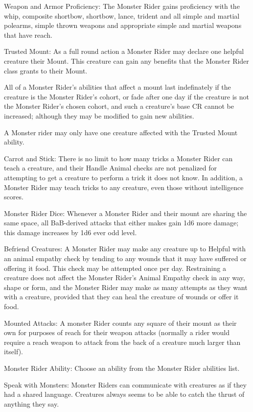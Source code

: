 Weapon and Armor Proficiency: The Monster Rider gains proficiency with the whip, composite shortbow, shortbow, lance, trident and all simple and martial polearms, simple thrown weapons and appropriate simple and martial weapons that have reach.

Trusted Mount: As a full round action a Monster Rider may declare one helpful creature their Mount. This creature can gain any benefits that the Monster Rider class grants to their Mount.

All of a Monster Rider's abilities that affect a mount last indefinately if the creature is the Monster Rider's cohort, or fade after one day if the creature is not the Monster Rider's chosen cohort, and such a creature's base CR cannot be increased; although they may be modified to gain new abilities.

A Monster rider may only have one creature affected with the Trusted Mount ability.

Carrot and Stick: There is no limit to how many tricks a Monster Rider can teach a creature, and their Handle Animal checks are not penalized for attempting to get a creature to perform a trick it does not know. In addition, a Monster Rider may teach tricks to any creature, even those without intelligence scores.

Monster Rider Dice: Whenever a Monster Rider and their mount are sharing the same space, all BaB-derived attacks that either makes gain 1d6 more damage; this damage increases by 1d6 ever odd level.

Befriend Creatures: A Monster Rider may make any creature up to Helpful with an animal empathy check by tending to any wounds that it may have suffered or offering it food. This check may be attempted once per day. Restraining a creature does not affect the Monster Rider's Animal Empathy check in any way, shape or form, and the Monster Rider may make as many attempts as they want with a creature, provided that they can heal the creature of wounds or offer it food.

Mounted Attacks: A monster Rider counts any square of their mount as their own for purposes of reach for their weapon attacks (normally a rider would require a reach weapon to attack from the back of a creature much larger than itself).

Monster Rider Ability: Choose an ability from the Monster Rider abilities list.

Speak with Monsters: Monster Riders can communicate with creatures as if they had a shared language. Creatures always seems to be able to catch the thrust of anything they say.


